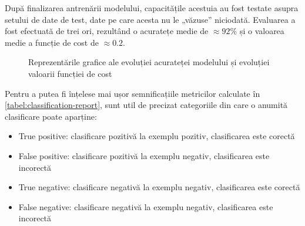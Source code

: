 După finalizarea antrenării modelului, capacitățile acestuia au fost testate asupra setului de date de test, date pe care acesta nu le „văzuse” niciodată. Evaluarea a fost efectuată de trei ori, rezultând o acuratețe medie de $\approx92\%$ și o valoarea medie a funcție de cost de $\approx0.2$.

\begin{figure}[ht]
\centering
{}
\qquad
{}
\caption{Reprezentările grafice ale evoluției acurateței modelului \protect{} și evoluției valoarii funcției de cost \protect{}}\label{fig:acc+loss+graph}
\end{figure}

Pentru a putea fi înțelese mai ușor semnificațiile metricilor calculate în \autoref{tabel:classification-report}, sunt util de precizat categoriile din care o anumită clasificare poate aparține: 
\begin{itemize}
\item True positive: clasificare pozitivă la exemplu pozitiv, clasificarea este corectă
\item False positive: clasificare pozitivă la exemplu negativ, clasificarea este incorectă
\item True negative: clasificare negativă la exemplu negativ, clasificarea este corectă
\item False negative: clasificare negativă la exemplu negativ, clasificarea este incorectă
\end{itemize}

